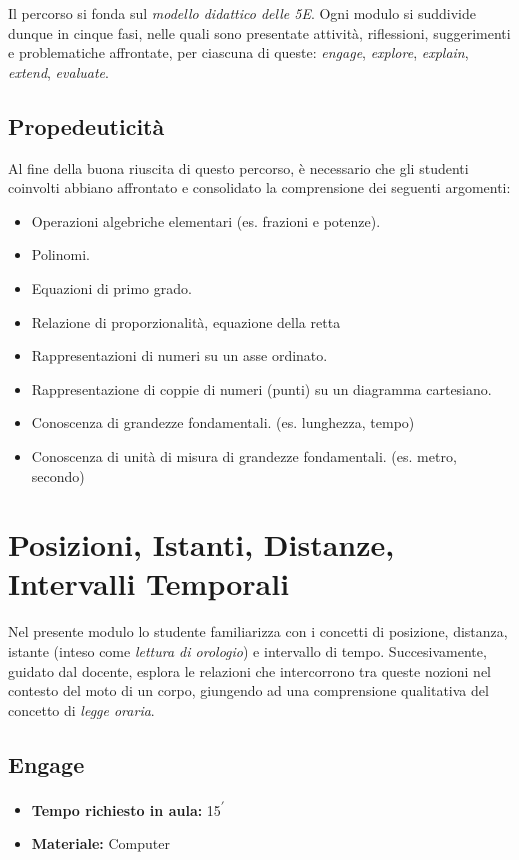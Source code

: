\documentclass{report} \usepackage[T1]{fontenc} \usepackage[italian]{babel}
\begin{document}
Il percorso si fonda sul \emph{modello didattico delle 5E}\cite{bybee2006bscs}.
Ogni modulo si suddivide dunque in cinque fasi, nelle quali sono presentate
attività, riflessioni, suggerimenti e problematiche affrontate, per ciascuna
di queste: \emph{engage}, \emph{explore}, \emph{explain}, \emph{extend},
\emph{evaluate}.

\section{Propedeuticità}
Al fine della buona riuscita di questo percorso, è necessario che gli
studenti coinvolti abbiano affrontato e consolidato la comprensione
dei seguenti argomenti:
\begin{itemize}
\item Operazioni algebriche elementari (es. frazioni e potenze).
\item Polinomi.
\item Equazioni di primo grado.
\item Relazione di proporzionalità, equazione della retta
\item Rappresentazioni di numeri su un asse ordinato.
\item Rappresentazione di coppie di numeri (punti) su un diagramma
      cartesiano.
\item Conoscenza di grandezze fondamentali.
      (es. lunghezza, tempo)
\item Conoscenza di unità di misura di grandezze fondamentali.
      (es. metro, secondo)
\end{itemize}

\chapter{Posizioni, Istanti, Distanze, Intervalli Temporali} \label{posizioni_istanti}
Nel presente modulo lo studente familiarizza con i concetti
di posizione, distanza, istante (inteso come
\emph{lettura di orologio}) e intervallo di tempo.
Succesivamente, guidato dal docente, esplora le relazioni
che intercorrono tra queste nozioni nel contesto del moto di
un corpo, giungendo ad una comprensione qualitativa del
concetto di \emph{legge oraria}.

\section{Engage}
\begin{itemize}
\item \textbf{Tempo richiesto in aula:} 15\textsuperscript{$\prime$}
\item \textbf{Materiale:} Computer
\end{itemize}
\end{document}

